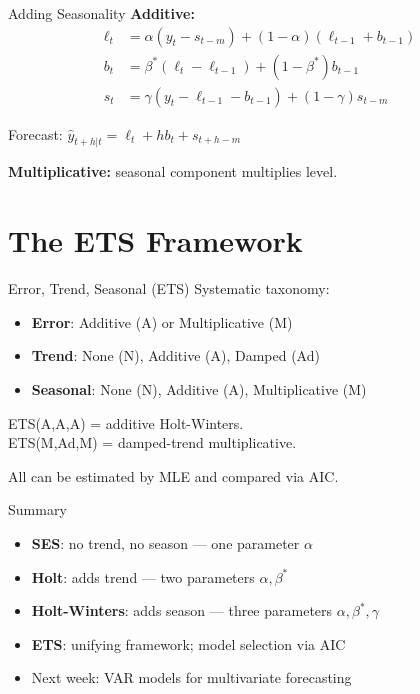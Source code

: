 \documentclass[aspectratio=169, 10pt]{beamer}
\begin{document}
\begin{frame}{Adding Seasonality}
\textbf{Additive:}
\begin{align}
\ell_t &= \alpha(y_t - s_{t-m}) + (1-\alpha)(\ell_{t-1} + b_{t-1}) \\
b_t &= \beta^*(\ell_t - \ell_{t-1}) + (1-\beta^*)b_{t-1} \\
s_t &= \gamma(y_t - \ell_{t-1} - b_{t-1}) + (1-\gamma)s_{t-m}
\end{align}

Forecast: $\hat{y}_{t+h|t} = \ell_t + hb_t + s_{t+h-m}$

\vspace{0.5em}
\textbf{Multiplicative:} seasonal component multiplies level.
\end{frame}

\section{The ETS Framework}

\begin{frame}{Error, Trend, Seasonal (ETS)}
Systematic taxonomy:
\begin{itemize}
    \item \textbf{Error}: Additive (A) or Multiplicative (M)
    \item \textbf{Trend}: None (N), Additive (A), Damped (Ad)
    \item \textbf{Seasonal}: None (N), Additive (A), Multiplicative (M)
\end{itemize}

\vspace{0.5em}
ETS(A,A,A) = additive Holt-Winters. \\
ETS(M,Ad,M) = damped-trend multiplicative.

\vspace{0.5em}
All can be estimated by \alert{MLE} and compared via \alert{AIC}.
\end{frame}

\begin{frame}{Summary}
\begin{itemize}
    \item \textbf{SES}: no trend, no season --- one parameter $\alpha$
    \item \textbf{Holt}: adds trend --- two parameters $\alpha, \beta^*$
    \item \textbf{Holt-Winters}: adds season --- three parameters $\alpha, \beta^*, \gamma$
    \item \textbf{ETS}: unifying framework; model selection via AIC
    \item Next week: \alert{VAR models} for multivariate forecasting
\end{itemize}
\end{frame}
\end{document}
